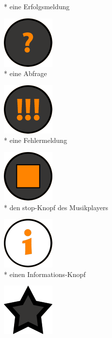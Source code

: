 \documentclass[FIPLY_base.tex]{subfiles}
\begin{document}
\begin{figure}[H]
\begin{subfigure}[b]{0.2\textwidth}
			\caption{* eine Erfolgsmeldung}
		\end{subfigure}
		\hfil
		\begin{subfigure}[b]{0.2\textwidth}
			\includegraphics[scale=0.5]{img/icons/questionsmall}
			\caption{* eine Abfrage}
		\end{subfigure}
		\hfil
		\begin{subfigure}[b]{0.2\textwidth}
			\includegraphics[scale=0.5]{img/icons/alertsmall}
			\caption{* eine Fehlermeldung}
		\end{subfigure}
		\hfil
		\begin{subfigure}[b]{0.2\textwidth}
			\includegraphics[scale=0.5]{img/icons/stop}
			\caption{* den stop-Knopf des Musikplayers}
		\end{subfigure}
		\hfil
		\begin{subfigure}[b]{0.2\textwidth}
			\includegraphics[scale=0.5]{img/icons/informationsmall}
			\caption{* einen Informations-Knopf}
		\end{subfigure}
		\hfil
		\begin{subfigure}[b]{0.2\textwidth}
			\includegraphics[scale=0.5]{img/icons/star_emptysmall}

\end{subfigure}
\end{figure}
\end{document}
